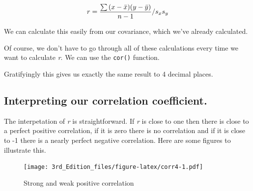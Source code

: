 \documentclass[
]{book}
\newenvironment{Shaded}{\begin{snugshade}}{\end{snugshade}}
\newcommand{\DecValTok}[1]{\textcolor[rgb]{0.00,0.00,0.81}{#1}}
\newcommand{\FloatTok}[1]{\textcolor[rgb]{0.00,0.00,0.81}{#1}}
\newcommand{\KeywordTok}[1]{\textcolor[rgb]{0.13,0.29,0.53}{\textbf{#1}}}
\newcommand{\NormalTok}[1]{#1}
\newcommand{\OperatorTok}[1]{\textcolor[rgb]{0.81,0.36,0.00}{\textbf{#1}}}
\newcommand{\StringTok}[1]{\textcolor[rgb]{0.31,0.60,0.02}{#1}}
\begin{document}
\[ \Large r = \frac{\sum{(x-\bar{x})(y-\bar{y})}}{n-1}/s_{x}s_{y}\]

We can calculate this easily from our covariance, which we've already calculated.

\begin{Shaded}
\end{Shaded}

Of course, we don't have to go through all of these calculations every time we want to calculate \emph{r}. We can use the \texttt{cor()} function.

\begin{Shaded}
\end{Shaded}

Gratifyingly this gives us exactly the same result to 4 decimal places.

\hypertarget{interpreting-our-correlation-coefficient.}{%
\subsection{Interpreting our correlation coefficient.}\label{interpreting-our-correlation-coefficient.}}

The interpetation of \emph{r} is straightforward. If \emph{r} is close to one then there is close to a perfect positive correlation, if it is zero there is no correlation and if it is close to -1 there is a nearly perfect negative correlation. Here are some figures to illustrate this.

\begin{figure}
\centering
\texttt{[image: 3rd\_Edition\_files/figure-latex/corr4-1.pdf]}
\caption{\label{fig:corr4}Strong and weak positive correlation}
\end{figure}
\end{document}
